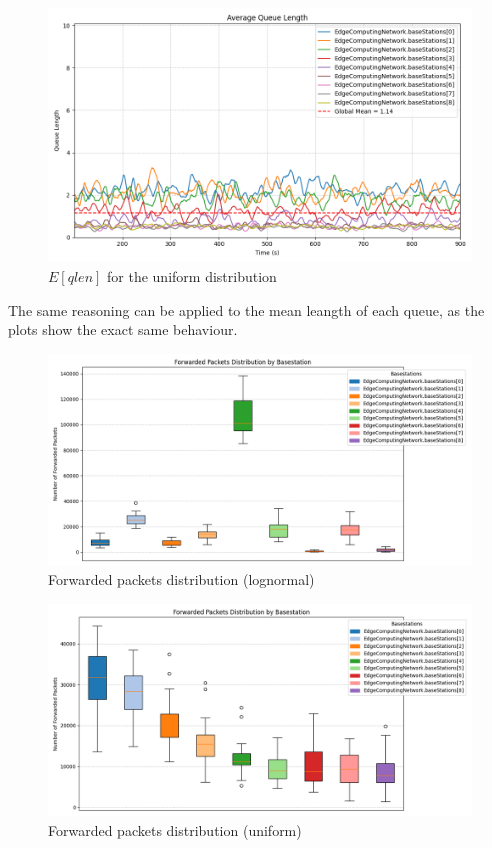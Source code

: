 \documentclass{report}
\begin{document}
\begin{figure}[H]
    \centering
    \includegraphics[width=\textwidth]{img/plots/uni_1e3_B/qlen.png}
    \caption{$E[qlen]$ for the uniform distribution}
\end{figure}

The same reasoning can be applied to the mean leangth of each queue, as the plots show the exact same behaviour.

\begin{figure}[H]
    \centering
    \includegraphics[width=\textwidth]{img/plots/log_1e3_B/forwarded.png}
    \caption{Forwarded packets distribution (lognormal)}
\end{figure}

\begin{figure}[H]
    \centering
    \includegraphics[width=\textwidth]{img/plots/uni_1e3_B/forwarded.png}
    \caption{Forwarded packets distribution (uniform)}
\end{figure}
\end{document}
